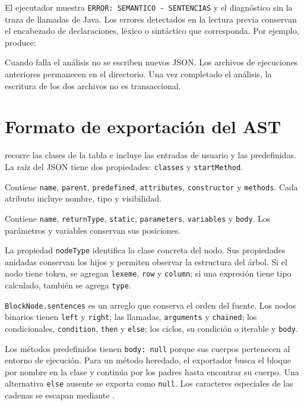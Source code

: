 El ejecutador muestra \texttt{ERROR: SEMANTICO - SENTENCIAS} y el
diagnóstico sin la traza de llamadas de Java. Los errores detectados en
la lectura previa conservan el encabezado de declaraciones, léxico o
sintáctico que corresponda. Por ejemplo,
 produce:


Cuando falla el análisis no se escriben nuevos JSON. Los archivos de
ejecuciones anteriores permanecen en el directorio. Una vez completado
el análisis, la escritura de los dos archivos no es transaccional.

\section{Formato de exportación del AST}
\label{sec:json-sentencias}
 recorre las clases de la tabla e
incluye las entradas de usuario y las predefinidas. La raíz del JSON
tiene dos propiedades: \texttt{classes} y \texttt{startMethod}.
\begin{description}[style=nextline]
  \item[Clase]
  Contiene \texttt{name}, \texttt{parent}, \texttt{predefined},
  \texttt{attributes}, \texttt{constructor} y \texttt{methods}.
  Cada atributo incluye nombre, tipo y visibilidad.
  \item[Método o constructor]
  Contiene \texttt{name}, \texttt{returnType}, \texttt{static},
  \texttt{parameters}, \texttt{variables} y \texttt{body}.
  Los parámetros y variables conservan sus posiciones.
  \item[Sentencia o expresión]
  La propiedad \texttt{nodeType} identifica la clase concreta del nodo.
  Sus propiedades anidadas conservan los hijos y permiten observar la
  estructura del árbol. Si el nodo tiene token, se agregan
  \texttt{lexeme}, \texttt{row} y \texttt{column}; si una expresión
  tiene tipo calculado, también se agrega \texttt{type}.
  \item[Orden de los cuerpos]
  \texttt{BlockNode.sentences} es un arreglo que conserva el orden del
  fuente. Los nodos binarios tienen \texttt{left} y \texttt{right};
  las llamadas, \texttt{arguments} y \texttt{chained}; los condicionales,
  \texttt{condition}, \texttt{then} y \texttt{else}; los ciclos,
  su condición o iterable y \texttt{body}.
\end{description}

Los métodos predefinidos tienen \texttt{body: null} porque sus cuerpos
pertenecen al entorno de ejecución. Para un método heredado, el
exportador busca el bloque por nombre en la clase y continúa por los
padres hasta encontrar su cuerpo. Una alternativa \texttt{else}
ausente se exporta como \texttt{null}. Los caracteres especiales de
las cadenas se escapan mediante .

